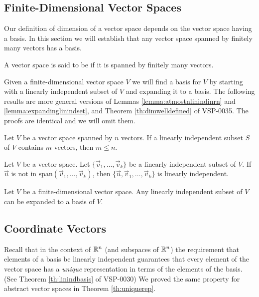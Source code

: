 \documentclass{ximera}
\begin{document}
\subsection*{Finite-Dimensional Vector Spaces}
Our definition of dimension of a vector space depends on the vector space having a basis.  In this section we will establish that any vector space spanned by finitely many vectors has a basis.

\begin{definition}\label{def:findimvectorspace}
A vector space is said to be  if it is spanned by finitely many vectors.
\end{definition}

Given a finite-dimensional vector space $V$ we will find a basis for $V$ by starting with a linearly independent subset of $V$ and expanding it to a basis.  The following results are more general versions of Lemmas \ref{lemma:atmostnlinindinrn} and \ref{lemma:expandinglinindset}, and Theorem \ref{th:dimwelldefined} of VSP-0035.  The proofs are identical and we will omit them.
\begin{lemma}\label{lemma:atmostnlinindinabstract}
Let $V$ be a vector space spanned by $n$ vectors.  If a linearly independent subset $S$ of $V$ contains $m$ vectors, then $m\leq n$.
\end{lemma}

\begin{lemma}\label{lemma:expandinglinindsetabstract}
Let $V$ be a vector space.  Let $\{\vec{v}_1,\ldots ,\vec{v}_k\}$ be a linearly independent subset of $V$.  If $\vec{u}$ is not in $\mbox{span}(\vec{v}_1,\ldots ,\vec{v}_k)$, then $\{\vec{u},\vec{v}_1,\ldots ,\vec{v}_k\}$ is linearly independent.
\end{lemma}

\begin{theorem}\label{th:expandtobasisabstract}
Let $V$ be a finite-dimensional vector space.  Any linearly independent subset of $V$ can be expanded to a basis of $V$.
\end{theorem}

\subsection*{Coordinate Vectors}

Recall that in the context of $\mathbb{R}^n$ (and subspaces of $\mathbb{R}^n$) the requirement that elements of a basis be linearly independent guarantees that every element of the vector space has a {\it unique} representation in terms of the elements of the basis.  (See Theorem \ref{th:linindbasis} of VSP-0030)  We proved the same property for abstract vector spaces in Theorem \ref{th:uniquerep}.
\end{document}
